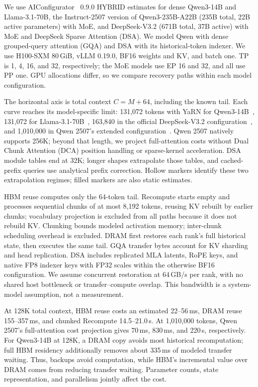 We use AIConfigurator~\cite{nvidia2026aiconfigurator} 0.9.0 HYBRID estimates
for dense Qwen3-14B and Llama-3.1-70B, the Instruct-2507 version of
Qwen3-235B-A22B (235B total, 22B active parameters) with MoE, and DeepSeek-V3.2
(671B total, 37B active) with MoE and DeepSeek Sparse Attention (DSA).
We model Qwen with dense grouped-query attention (GQA) and DSA with its
historical-token indexer. We use
H100-SXM 80\,GiB, vLLM 0.19.0, BF16 weights and KV, and batch one.
TP is 1, 4, 16, and 32, respectively; the MoE models use EP 16 and 32,
and all use PP one. GPU allocations differ, so we compare recovery
paths within each model configuration.

The horizontal axis is total context $C=M+64$, including the known tail.
Each curve reaches its model-specific limit: 131,072 tokens with YaRN
for Qwen3-14B~\cite{qwen2025technical}, 131,072 for
Llama-3.1-70B~\cite{meta2024llama31card}, 163,840 in the official
DeepSeek-V3.2 configuration~\cite{deepseek2025v32config}, and 1,010,000
in Qwen 2507's extended configuration~\cite{qwen2025instruct2507}.
Qwen 2507 natively supports 256K; beyond that length, we project
full-attention costs without Dual Chunk Attention (DCA) position handling
or sparse-kernel acceleration. DSA module tables end at 32K; longer
shapes extrapolate those tables, and cached-prefix queries use analytical
prefix correction. Hollow markers identify these two extrapolation
regimes; filled markers are also static estimates.

HBM reuse computes only the 64-token tail. Recompute starts empty and
processes sequential chunks of at most 8,192 tokens, reusing KV rebuilt
by earlier chunks; vocabulary projection is excluded
from all paths because it does not rebuild KV. Chunking bounds modeled
activation memory; inter-chunk scheduling overhead is excluded.
DRAM first restores each rank's full historical
state, then executes the same tail. GQA transfer bytes account for KV
sharding and head replication. DSA includes replicated MLA latents,
RoPE keys, and native FP8 indexer keys with FP32 scales within the
otherwise BF16 configuration. We assume concurrent restoration at
64\,GB/s per rank, with no shared host bottleneck or transfer--compute
overlap. This bandwidth is a system-model assumption, not a measurement.

At 128K total context, HBM reuse costs an estimated 22--56\,ms,
DRAM reuse 155--357\,ms, and chunked Recompute 14.5--21.0\,s.
At 1,010,000 tokens, Qwen 2507's full-attention cost projection gives
70\,ms, 830\,ms, and 220\,s, respectively. For Qwen3-14B at 128K,
a DRAM copy avoids most historical recomputation; full HBM residency
additionally removes about 335\,ms of modeled transfer waiting.
Thus, backups avoid computation, while HBM's incremental value over
DRAM comes from reducing transfer waiting. Parameter counts, state
representation, and parallelism jointly affect the cost.

